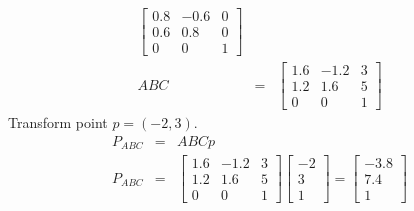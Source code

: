 \begin{itemize}
{\begin{eqnarray*}
            \begin{bmatrix}
            0.8 & -0.6 & 0\\
            0.6 & 0.8 & 0\\
            0 & 0 & 1
            \end{bmatrix}\\
        ABC&=&
            \begin{bmatrix}
            1.6 & -1.2 & 3\\
            1.2 & 1.6 & 5\\
            0 & 0 & 1
            \end{bmatrix}
    \end{eqnarray*}
    Transform point $p=(-2,3)$.
    \begin{eqnarray*}
        P_{ABC} &=& ABCp\\
        P_{ABC} &=&
        \begin{bmatrix}
        1.6 & -1.2 & 3\\
        1.2 & 1.6 & 5\\
        0 & 0 & 1
        \end{bmatrix}
        \begin{bmatrix}
        -2 \\ 3 \\ 1
        \end{bmatrix} =
        \begin{bmatrix}
        -3.8\\7.4\\1
        \end{bmatrix}
    \end{eqnarray*}
    }
\end{itemize}
